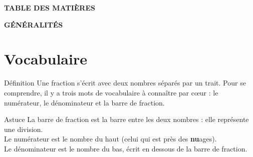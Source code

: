 \clearpage

\newcommand{\TocExos}[2]{\def\tmpa{#1}\def\tmpb{#2}\phantomsection\ifx\tmpa\tmpb\addcontentsline{toc}{subsection}{Exercice \ref{#1}}\else\addcontentsline{toc}{subsection}{Exercices \ref{#1} à \ref{#2}}\fi}
\setcounter{tocdepth}{2}
\begin{center}
\begin{tcolorbox}[colback=themeNO!30,colframe=themeNO!65!black,halign=flush center,width=\textwidth,arc=3mm,boxsep=3mm]
{\Large\bfseries\color{themeNO!65!black} TABLE DES MATIÈRES}
\end{tcolorbox}
\end{center}
\vfill
\begingroup
\makeatletter
\setlength{\parskip}{0pt}
\renewcommand*\l@part[2]{\par\addvspace{20pt}\noindent{\bfseries\color{themeNO!65!black} #1}\hfill{\bfseries #2}\par\nopagebreak}
\renewcommand*\l@section{\addvspace{5pt}\@dottedtocline{1}{0em}{1.8em}}
\renewcommand*\l@subsection{\@dottedtocline{2}{1.8em}{2.3em}}
\makeatother
\endgroup

\clearpage
\pagestyle{plain}
\setcounter{page}{1}

\begin{center}
\begin{tcolorbox}[colback=themeNO!30,colframe=themeNO!65!black,halign=flush center,width=\textwidth,arc=3mm,boxsep=3mm]
{\Large\bfseries\color{themeNO!65!black} GÉNÉRALITÉS}
\end{tcolorbox}
\end{center}


\section{Vocabulaire}\label{sec:VocabulaireFractions}
 
\begin{regle}{Définition}
Une fraction s'écrit avec deux nombres séparés par un trait. Pour se comprendre, il y a trois mots de vocabulaire à connaître par c\oe ur : le \textcolor{themeColor}{numérateur}, le \textcolor{themeColor}{dénominateur} et la \textcolor{themeColor}{barre de fraction}.
\end{regle}
 
\vspace{15pt}
\begin{astuce}{Astuce}
La \textcolor{themeColor}{barre de fraction} est la barre entre les deux nombres : elle représente une division.\\[5pt]
Le \textcolor{themeColor}{numérateur} est le nombre du haut (celui qui est près des \textbf{nu}ages).\\[5pt]
Le \textcolor{themeColor}{dénominateur} est le nombre du bas, écrit en dessous de la barre de fraction.
\end{astuce}
 
